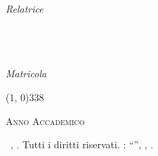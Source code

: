 \begin{titlepage}
\begin{center}
        \vspace{50pt}
        
        \begin{normalsize}
            \begin{flushleft}
                \textit{Relatrice}\\
                \profTitle\ \myProf
            \end{flushleft}

            \vspace{-48pt}
            
            \begin{flushright}
                \textit{\graduateTitle}\\
                \myName\\
                \textit{Matricola} \myStudentID
            \end{flushright}
        \end{normalsize}

        \vspace*{\fill}
        
        \line(1, 0){338} \\
        \begin{normalsize}
            \textsc{Anno Accademico \myAA}
        \end{normalsize}
    \end{center}
\end{titlepage}

\clearpage
{}
\thispagestyle{empty}
\hfill
\vfill

{\small\noindent\textcopyright\ \myName, \myTime. Tutti i diritti riservati. \myDegree: ``\textit{\myTitle}'', \myUni, \myDepartment.}